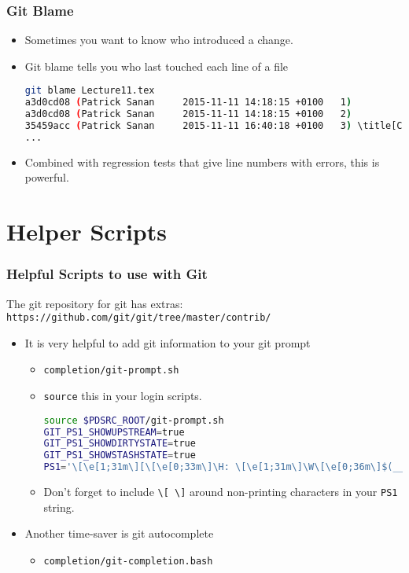 \begin{frame}[fragile]
\frametitle{Git Blame}
\begin{itemize}
\item Sometimes you want to know who introduced a change.
\item Git blame tells you who last touched each line of a file
\begin{lstlisting}[language=bash,
basicstyle=\tiny\ttfamily]
git blame Lecture11.tex
a3d0cd08 (Patrick Sanan     2015-11-11 14:18:15 +0100   1) 
a3d0cd08 (Patrick Sanan     2015-11-11 14:18:15 +0100   2)
35459acc (Patrick Sanan     2015-11-11 16:40:18 +0100   3) \title[CEFCS Week 11]{Software Engineering for Computational Science: Week 11}
...
\end{lstlisting}
\item Combined with regression tests that give line numbers with errors, this is powerful.
\end{itemize}
\end{frame}

\section{Helper Scripts}
\begin{frame}[fragile]
\frametitle{Helpful Scripts to use with Git}
The git repository for git has extras: \texttt{https://github.com/git/git/tree/master/contrib/}
\begin{itemize}
\item It is very helpful to add git information to your git prompt
\begin{itemize}
\item \texttt{completion/git-prompt.sh}
\item \lstinline{source} this in your login scripts.
\begin{lstlisting}[language=bash]
source $PDSRC_ROOT/git-prompt.sh
GIT_PS1_SHOWUPSTREAM=true
GIT_PS1_SHOWDIRTYSTATE=true
GIT_PS1_SHOWSTASHSTATE=true
PS1='\[\e[1;31m\][\[\e[0;33m\]\H: \[\e[1;31m\]\W\[\e[0;36m\]$(__git_ps1 " (%s)")\[\e[1;31m\]]\$\[\e[0m\] '
\end{lstlisting}
\item Don't forget to include \lstinline{\[ \]} around non-printing characters in your \lstinline{PS1} string.
\end{itemize}
\item Another time-saver is git autocomplete
\begin{itemize}
\item \texttt{completion/git-completion.bash}
\end{itemize}
\end{itemize}
\end{frame}



